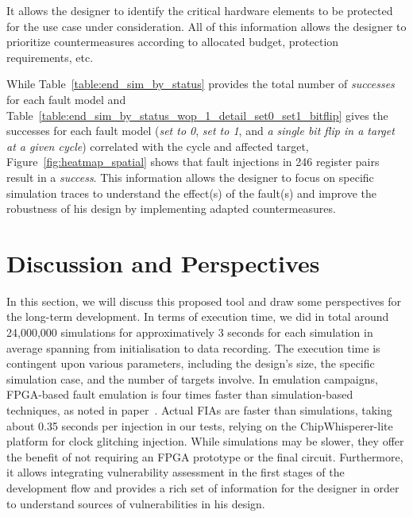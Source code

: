 It allows the designer to identify the critical hardware elements to be protected for the use case under consideration.
All of this information allows the designer to prioritize countermeasures according to allocated budget, protection requirements, etc.

While Table~\ref{table:end_sim_by_status} provides the total number of \textit{successes} for each fault model and Table~\ref{table:end_sim_by_status_wop_1_detail_set0_set1_bitflip} gives the successes for each fault model (\textit{set to 0}, \textit{set to 1}, and \textit{a single bit flip in a target at a given cycle}) correlated with the cycle and affected target, Figure~\ref{fig:heatmap_spatial} shows that fault injections in 246 register pairs result in a \textit{success}. This information allows the designer to focus on specific simulation traces to understand the effect(s) of the fault(s) and improve the robustness of his design by implementing adapted countermeasures.

\section{Discussion and Perspectives}

In this section, we will discuss this proposed tool and draw some perspectives for the long-term development.
In terms of execution time, we did in total around 24,000,000 simulations for approximatively 3 seconds for each simulation in average spanning from initialisation to data recording.
The execution time is contingent upon various parameters, including the design's size, the specific simulation case, and the number of targets involve. %
In emulation campaigns, FPGA-based fault emulation is four times faster than simulation-based techniques, as noted in paper~\cite{NNHRS-14-dsd}. Actual FIAs are faster than simulations, taking about 0.35 seconds per injection in our tests, relying on the ChipWhisperer-lite platform for clock glitching injection.
While simulations may be slower, they offer the benefit of not requiring an FPGA prototype or the final circuit. Furthermore, it allows integrating vulnerability assessment in the first stages of the development flow and provides a rich set of information for the designer in order to understand sources of vulnerabilities in his design.

